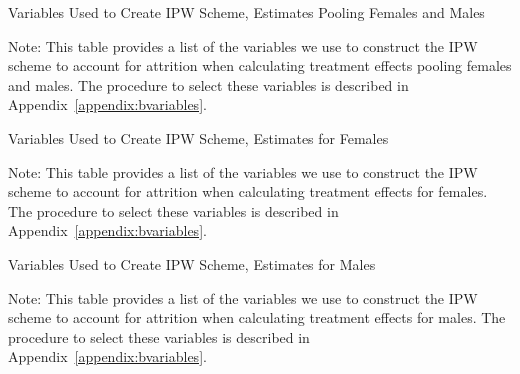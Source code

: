 \begin{sidewaystable}[H]
\begin{threeparttable}
\caption{Variables Used to Create IPW Scheme, Estimates Pooling Females and Males}
\label{table:attpooled}
\centering

\begin{tablenotes}
\footnotesize
\item Note: This table provides a list of the variables we use to construct the IPW scheme to account for attrition when calculating treatment effects pooling females and males. The procedure to select these variables is described in Appendix~\ref{appendix:bvariables}.
\end{tablenotes}
\end{threeparttable}
\end{sidewaystable}

\begin{sidewaystable}[H]
\begin{threeparttable}
\caption{Variables Used to Create IPW Scheme, Estimates for Females}
\label{table:attfemales}
\centering

\begin{tablenotes}
\footnotesize
\item Note: This table provides a list of the variables we use to construct the IPW scheme to account for attrition when calculating treatment effects for females. The procedure to select these variables is described in Appendix~\ref{appendix:bvariables}.
\end{tablenotes}
\end{threeparttable}
\end{sidewaystable}

\begin{sidewaystable}[H]
\begin{threeparttable}
\caption{Variables Used to Create IPW Scheme, Estimates for Males}
\label{table:attfemales}
\centering

\begin{tablenotes}
\footnotesize
\item Note: This table provides a list of the variables we use to construct the IPW scheme to account for attrition when calculating treatment effects for males.  The procedure to select these variables is described in Appendix~\ref{appendix:bvariables}.
\end{tablenotes}
\end{threeparttable}
\end{sidewaystable}
\restoregeometry
\doublespacing 